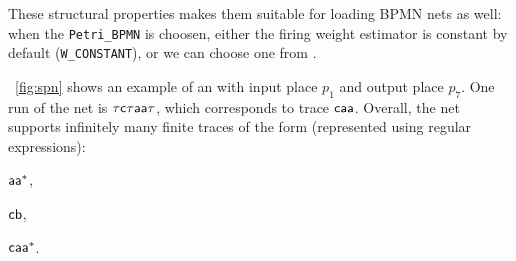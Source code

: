  
 These structural properties makes them suitable for loading BPMN nets as well: when the \texttt{Petri\_BPMN} is choosen, either the firing weight estimator is constant by default (\texttt{W\_CONSTANT}), or we can choose one from \cite{spdwe}. 
\begin{example} %
\label{ex:net}
\figurename~\ref{fig:spn} shows an example of an \uswn with input place $p_1$ and output place $p_7$. One run of the net is $\mathsf{\tau c \tau a a \tau}$, which corresponds to trace $\mathsf{caa}$. Overall, the net supports infinitely many finite traces of the form (represented using regular expressions):
\begin{inparaenum}[\it (i)]
\item $\mathsf{aa^*}$,
\item $\mathsf{cb}$,
\item $\mathsf{caa^*}$.
\end{inparaenum}
\end{example}


